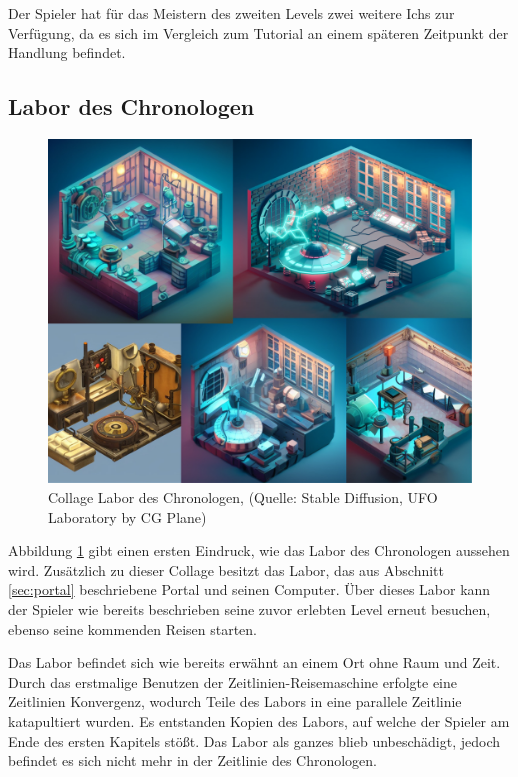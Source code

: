 Der Spieler hat für das Meistern des zweiten Levels zwei weitere Ichs zur Verfügung, da es sich im Vergleich zum Tutorial an einem späteren Zeitpunkt der Handlung befindet. 

\subsection{Labor des Chronologen}

\begin{figure}[ht]
\centering
\includegraphics[width=1\linewidth]{content/pictures/Collage Labor Chronologist.jpg}
\caption{Collage Labor des Chronologen, (Quelle: Stable Diffusion, UFO Laboratory by CG Plane)}
\label{fig:collage_labor_chron}
\end{figure}

Abbildung \ref{fig:collage_labor_chron}  gibt einen ersten Eindruck, wie das Labor des Chronologen aussehen wird. Zusätzlich zu dieser Collage besitzt das Labor, das aus Abschnitt \ref{sec:portal}  beschriebene Portal und seinen Computer. Über dieses Labor kann der Spieler wie bereits beschrieben seine zuvor erlebten Level erneut besuchen, ebenso seine kommenden Reisen starten.

Das Labor befindet sich wie bereits erwähnt an einem Ort ohne Raum und Zeit. Durch das erstmalige Benutzen der Zeitlinien-Reisemaschine erfolgte eine Zeitlinien Konvergenz, wodurch Teile des Labors in eine parallele Zeitlinie katapultiert wurden. Es entstanden Kopien des Labors, auf welche der Spieler am Ende des ersten Kapitels stößt. Das Labor als ganzes blieb unbeschädigt, jedoch befindet es sich nicht mehr in der Zeitlinie des Chronologen.

